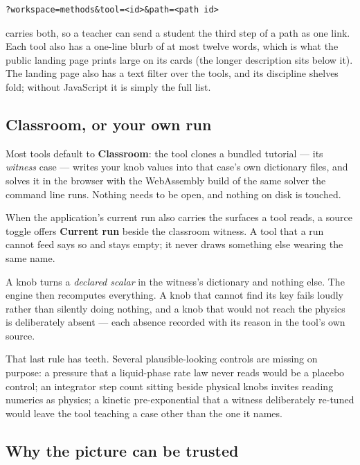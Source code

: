 \documentclass[11pt,a4paper]{article}
\begin{document}
\begin{lstlisting}[language=shell]
?workspace=methods&tool=<id>&path=<path id>
\end{lstlisting}

\noindent
carries both, so a teacher can send a student the third step of a path as
one link.  Each tool also has a one-line blurb of at most twelve words,
which is what the public landing page prints large on its cards (the longer
description sits below it).  The landing page also has a text filter
over the tools, and its discipline shelves fold; without JavaScript it is
simply the full list.

\subsection{Classroom, or your own run}

Most tools default to \textbf{Classroom}: the tool clones a bundled
tutorial --- its \emph{witness} case --- writes your knob values into that
case's own dictionary files, and solves it in the browser with the
WebAssembly build of the same solver the command line runs.  Nothing needs
to be open, and nothing on disk is touched.

When the application's current run also carries the surfaces a tool reads,
a source toggle offers \textbf{Current run} beside the classroom witness.
A tool that a run cannot feed says so and stays empty; it never draws
something else wearing the same name.

\begin{keyidea}
A knob turns a \emph{declared scalar} in the witness's dictionary and
nothing else.  The engine then recomputes everything.  A knob that cannot
find its key fails loudly rather than silently doing nothing, and a knob
that would not reach the physics is deliberately absent --- each absence
recorded with its reason in the tool's own source.
\end{keyidea}

That last rule has teeth.  Several plausible-looking controls are missing
on purpose: a pressure that a liquid-phase rate law never reads would be a
placebo control; an integrator step count sitting beside physical knobs
invites reading numerics as physics; a kinetic pre-exponential that a
witness deliberately re-tuned would leave the tool teaching a case other
than the one it names.

\subsection{Why the picture can be trusted}
\end{document}
